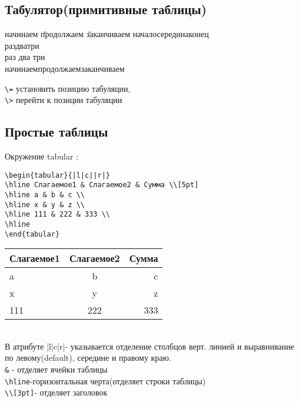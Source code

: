 \documentclass[a4paper,12pt]{article}%
\theoremstyle{plain}%
\theoremstyle{definition}%
\theoremstyle{remark}%
\begin{document}
\subsection{Табулятор(примитивные таблицы)}

\begin{tabbing}
начинаем \=продолжаем \= заканчиваем\kill%
начало\>середина\>конец\\%
раз\>два\>три\\%
раз\> два\> три\\ 
начинаем\>продолжаем\>заканчиваем\\ 
\end{tabbing}
\verb|\=| установить позицию табуляции, \\
\verb|\>| перейти к позиции табуляции



\subsection{Простые таблицы}

Окружение tabular :
\begin{verbatim}
\begin{tabular}{|l|c||r|}
\hline Слагаемое1 & Слагаемое2 & Сумма \\[5pt]
\hline a & b & c \\
\hline x & y & z \\
\hline 111 & 222 & 333 \\
\hline
\end{tabular}
\end{verbatim}

\begin{tabular}{|l||c|r|}
\hline Слагаемое1 & Слагаемое2 & Сумма \\[3pt]
\hline a & b & c \\
\hline x & y & z \\
\hline 111 & 222 & 333 \\
\hline
\end{tabular} \\

\noindent В атрибуте {|l|c|r|}- указывается отделение столбцов верт. линией и выравнивание по левому(default), середине и правому краю. \\
\verb|&| - отделяет ячейки таблицы \\
\verb|\hline|-горизонтальная черта(отделяет строки таблицы) \\
\verb|\\[3pt]|- отделяет заголовок
\end{document}
